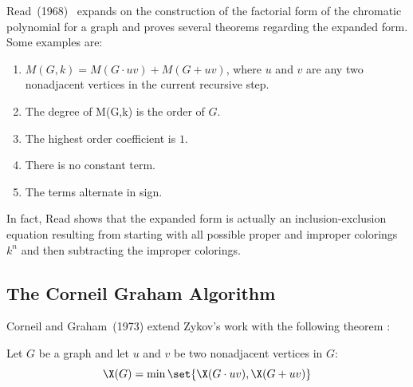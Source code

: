 Read~(1968)~\cite{read} expands on the construction of the factorial form of the chromatic polynomial for a graph
and proves several theorems regarding the expanded form.  Some examples are:
\begin{enumerate}
\item \(M(G,k)=M(G\cdot uv)+M(G+uv)\), where \(u\) and \(v\) are any two nonadjacent vertices in the current
  recursive step.
\item The degree of M(G,k) is the order of \(G\).
\item The highest order coefficient is \(1\).
\item There is no constant term.
\item The terms alternate in sign.
\end{enumerate}
In fact, Read shows that the expanded form is actually an inclusion-exclusion equation resulting from starting with
all possible proper and improper colorings \(k^n\) and then subtracting the improper colorings.

\subsection{The Corneil Graham Algorithm}\label{sec:sub:corneil}

Corneil and Graham~(1973) extend Zykov's work with the following theorem \cite{corneil}:

\begin{theorem}
  \label{thm:corneil}
  Let \(G\) be a graph and let \(u\) and \(v\) be two nonadjacent vertices in \(G\):
  \[\X(G)=\min\set{\X(G\cdot uv),\X(G+uv)}\]
\end{theorem}

